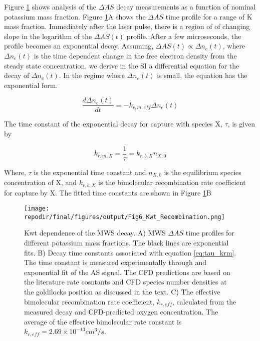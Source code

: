 Figure \ref{fig:kwt_recombination} shows analysis of the $\Delta AS$ decay measurements as a function of nominal potassium mass fraction.  Figure \ref{fig:kwt_recombination}A shows the $\Delta AS$ time profile for a range of K mass fraction. Immediately after the laser pulse, there is a region of of changing slope in the logarithm of the $\Delta AS (t)$ profile. After a few microseconds, the profile becomes an exponential decay. Assuming, $\Delta AS (t) \propto \Delta n_e (t)$, where $\Delta n_e (t)$ is the time dependent change in the free electron density from the steady state concentration, we derive in the SI a differential equation for the decay of $\Delta n_e (t)$. In the regime where $\Delta n_e (t)$ is small, the equation has the exponential form.  

\begin{equation}
    \label{eq:fit_eq}
    \frac{d\Delta n_e (t)}{dt} = - k_{r, m, eff} \Delta n_e (t) 
\end{equation}

The time constant of the exponential decay for capture with species X, $\tau$, is given by

\begin{equation}
    \label{eq:tau_krm}
    k_{r, m, X} = \frac{1}{\tau} = k_{r, b, X}n_{X,0}
\end{equation}

Where, $\tau$ is the exponential time constant and $n_{X,0}$ is the equilibrium species concentration of X, and $k_{r, b, X}$ is the bimolecular recombination rate coefficient for capture by X. The fitted time constants are shown in Figure \ref{fig:kwt_recombination}B 


\begin{figure}[h]
    \texttt{[image: \\repodir/final/figures/output/Fig6\_Kwt\_Recombination.png]} 
    \centering
    \caption{Kwt dependence of the MWS decay. A) MWS $\Delta AS$ time profiles for different potassium mass fractions. The black lines are exponential fits. B) Decay time constants associated with equation \ref{eq:tau_krm}. The time constant is measured experimentally through and exponential fit of the AS signal. The CFD predictions are based on the literature rate cosntants and CFD species number densities at the goldilocks position as discussed in the text. C) The effective bimolecular recombination rate coefficient, $k_{r,eff}$, calculated from the measured decay and CFD-predicted oxygen concentration. The average of the effective bimolecular rate constant is $k_{r,eff} =  2.69 \times 10^{-13} cm^3/s$.}
    \label{fig:kwt_recombination}
\end{figure}



